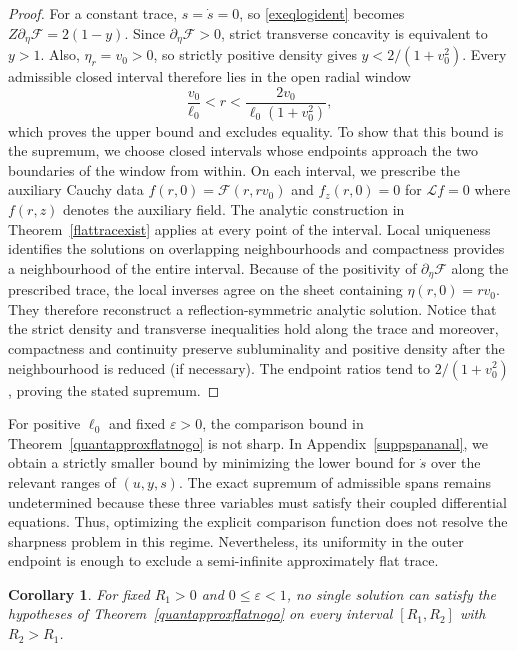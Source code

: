 \documentclass[amsmath,amsfonts,amssymb,aps,pra,superscriptaddress,10pt]{revtex4-2}
\numberwithin{equation}{section}
\theoremstyle{plain}
\newtheorem{corollary}{Corollary}
\theoremstyle{definition}
\theoremstyle{remark}
\theoremstyle{definition}
\newcommand{\ellzero}{\ell_0}
\begin{document}
\begin{proof}
For a constant trace, $s=\dot{s}=0$, so \eqref{exeqlogident} becomes $Z\partial_\eta\mathcal{F}=2(1-y)$. Since $\partial_\eta\mathcal{F}>0$, strict transverse concavity is equivalent to $y>1$. Also, $\eta_r=v_0>0$, so strictly positive density gives $y<2/(1+v_0^2)$. Every admissible closed interval therefore lies in the open radial window
\begin{equation}
\frac{v_0}{\ellzero}<r<\frac{2v_0}{\ellzero(1+v_0^2)},
\end{equation}
which proves the upper bound and excludes equality. To show that this bound is the supremum, we choose closed intervals whose endpoints approach the two boundaries of the window from within. On each interval, we prescribe the auxiliary Cauchy data $f(r,0)=\mathcal{F}(r,rv_0)$ and $f_z(r,0)=0$ for $\mathcal{L}f=0$ where $f(r,z)$ denotes the auxiliary field. The analytic construction in Theorem~\ref{flattracexist} applies at every point of the interval. Local uniqueness identifies the solutions on overlapping neighbourhoods and compactness provides a neighbourhood of the entire interval. Because of the positivity of $\partial_\eta\mathcal{F}$ along the prescribed trace, the local inverses agree on the sheet containing $\eta(r,0)=rv_0$. They therefore reconstruct a reflection-symmetric analytic solution. Notice that the strict density and transverse inequalities hold along the trace and moreover, compactness and continuity preserve subluminality and positive density after the neighbourhood is reduced (if necessary). The endpoint ratios tend to $2/(1+v_0^2)$, proving the stated supremum.
\end{proof}

For positive $\ellzero$ and fixed $\varepsilon>0$, the comparison bound in Theorem~\ref{quantapproxflatnogo} is not sharp. In Appendix~\ref{suppspananal}, we obtain a strictly smaller bound by minimizing the lower bound for $\dot{s}$ over the relevant ranges of $(u,y,s)$. The exact supremum of admissible spans remains undetermined because these three variables must satisfy their coupled differential equations. Thus, optimizing the explicit comparison function does not resolve the sharpness problem in this regime. Nevertheless, its uniformity in the outer endpoint is enough to exclude a semi-infinite approximately flat trace.

\begin{corollary}
For fixed $R_1>0$ and $0\leq\varepsilon<1$, no single solution can satisfy the hypotheses of Theorem~\ref{quantapproxflatnogo} on every interval $[R_1,R_2]$ with $R_2>R_1$.
\end{corollary}
\end{document}
